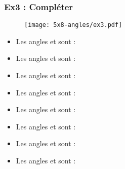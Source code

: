 \subsubsection*{Ex3 : Compléter}

\begin{figure}[H]
  \centering
  \texttt{[image: 5x8-angles/ex3.pdf]}
\end{figure}


\begin{itemize}
  \item Les angles \hspace{1cm} et \hspace{1cm} sont : \dotfill
  \item Les angles \hspace{1cm} et \hspace{1cm} sont : \dotfill
  \item Les angles \hspace{1cm} et \hspace{1cm} sont : \dotfill
  \item Les angles \hspace{1cm} et \hspace{1cm} sont : \dotfill
  \item Les angles \hspace{1cm} et \hspace{1cm} sont : \dotfill
  \item Les angles \hspace{1cm} et \hspace{1cm} sont : \dotfill
  \item Les angles \hspace{1cm} et \hspace{1cm} sont : \dotfill
  \item Les angles \hspace{1cm} et \hspace{1cm} sont : \dotfill
\end{itemize}



